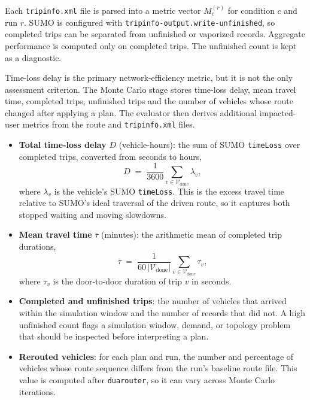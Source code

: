 Each \texttt{tripinfo.xml} file is parsed into a metric vector $M_c^{(r)}$ for
condition $c$ and run $r$. SUMO is configured with
\texttt{tripinfo-output.write-unfinished}, so completed trips can be separated
from unfinished or vaporized records. Aggregate performance is computed only
on completed trips. The unfinished count is kept as a diagnostic.

Time-loss delay is the primary network-efficiency metric, but it is not the
only assessment criterion. The Monte Carlo stage stores time-loss delay, mean
travel time, completed trips, unfinished trips and the number of vehicles whose
route changed after applying a plan. The evaluator then derives additional
impacted-user metrics from the route and \texttt{tripinfo.xml} files.

\begin{itemize}
  \item \textbf{Total time-loss delay} $D$ (vehicle-hours): the sum of
    SUMO \texttt{timeLoss} over completed trips, converted from seconds
    to hours,
    \begin{equation}
      D \;=\; \frac{1}{3600} \sum_{v \in \mathcal{V}_{\mathrm{done}}} \lambda_v,
      \label{eq:mc_delay}
    \end{equation}
    where $\lambda_v$ is the vehicle's SUMO \texttt{timeLoss}. This is the
    excess travel time relative to SUMO's ideal traversal of the driven route,
    so it captures both stopped waiting and moving slowdowns.

  \item \textbf{Mean travel time} $\bar{\tau}$ (minutes): the arithmetic mean
    of completed trip durations,
    \begin{equation}
      \bar{\tau} \;=\;
      \frac{1}{60\,|\mathcal{V}_{\mathrm{done}}|}
      \sum_{v \in \mathcal{V}_{\mathrm{done}}} \tau_v,
      \label{eq:mc_tt}
    \end{equation}
    where $\tau_v$ is the door-to-door duration of trip $v$ in seconds.

  \item \textbf{Completed and unfinished trips}: the number of vehicles that
    arrived within the simulation window and the number of records that did
    not. A high unfinished count flags a simulation window, demand, or
    topology problem that should be inspected before interpreting a plan.

  \item \textbf{Rerouted vehicles}: for each plan and run, the number and
    percentage of vehicles whose route sequence differs from the run's
    baseline route file. This value is computed after \texttt{duarouter}, so
    it can vary across Monte Carlo iterations.
\end{itemize}

